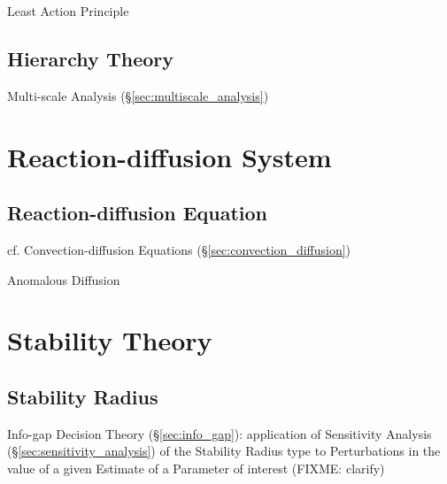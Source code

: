 Least Action Principle



\subsection{Hierarchy Theory}\label{sec:hierarchy_theory}

Multi-scale Analysis (\S\ref{sec:multiscale_analysis})



\section{Reaction-diffusion System}\label{sec:reaction_diffusion}

\subsection{Reaction-diffusion Equation}\label{sec:reaction_diffusion_equation}

\fist cf. Convection-diffusion Equations (\S\ref{sec:convection_diffusion})

Anomalous Diffusion



\section{Stability Theory}\label{sec:stability_theory}

\subsection{Stability Radius}\label{sec:stability_radius}

\fist Info-gap Decision Theory (\S\ref{sec:info_gap}): application of
Sensitivity Analysis (\S\ref{sec:sensitivity_analysis}) of the Stability Radius
type to Perturbations in the value of a given Estimate of a Parameter of
interest (FIXME: clarify)



